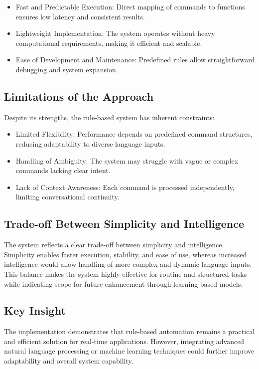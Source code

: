 \documentclass[conference]{IEEEtran}
\begin{document}
\begin{itemize}
    \item Fast and Predictable Execution: Direct mapping of commands to functions ensures low latency and consistent results.
    \item Lightweight Implementation: The system operates without heavy computational requirements, making it efficient and scalable.
    \item Ease of Development and Maintenance: Predefined rules allow straightforward debugging and system expansion.
\end{itemize}

\subsection{Limitations of the Approach}
\noindent
Despite its strengths, the rule-based system has inherent constraints:

\begin{itemize}
    \item Limited Flexibility: Performance depends on predefined command structures, reducing adaptability to diverse language inputs.
    \item Handling of Ambiguity: The system may struggle with vague or complex commands lacking clear intent.
    \item Lack of Context Awareness: Each command is processed independently, limiting conversational continuity.
\end{itemize}

\subsection{Trade-off Between Simplicity and Intelligence}
\noindent
The system reflects a clear trade-off between simplicity and intelligence. Simplicity enables faster execution, stability, and ease of use, whereas increased intelligence would allow handling of more complex and dynamic language inputs. This balance makes the system highly effective for routine and structured tasks while indicating scope for future enhancement through learning-based models.

\subsection{Key Insight}
\noindent
The implementation demonstrates that rule-based automation remains a practical and efficient solution for real-time applications. However, integrating advanced natural language processing or machine learning techniques could further improve adaptability and overall system capability.
\end{document}
